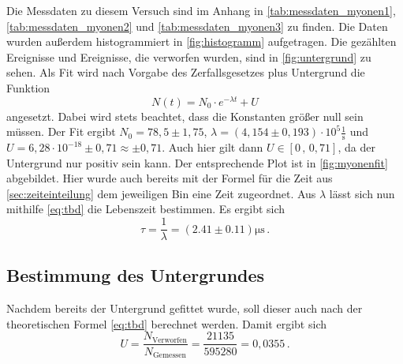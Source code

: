 Die Messdaten zu diesem Versuch sind im Anhang in \autoref{tab:messdaten_myonen1}, \autoref{tab:messdaten_myonen2} und \autoref{tab:messdaten_myonen3} zu finden.
Die Daten wurden außerdem histogrammiert in \autoref{fig:histogramm} aufgetragen.
Die gezählten Ereignisse und Ereignisse, die verworfen wurden, sind in \autoref{fig:untergrund} zu sehen.
Als Fit wird nach Vorgabe des Zerfallsgesetzes plus Untergrund die Funktion
\begin{equation*}
    N(t) = N_0 \cdot e^{- \lambda t} + U
\end{equation*} 
angesetzt.
Dabei wird stets beachtet, dass die Konstanten größer null sein müssen.
Der Fit ergibt $N_0 = 78,5 \pm 1,75$, $\lambda = (4,154 \pm 0,193) \cdot 10^5 \frac{1}{\unit{\second}}$ und $U = 6,28 \cdot 10^{-18} \pm 0,71 \approx \pm 0,71$.
Auch hier gilt dann $U \in [0 \, , \, 0,71]$, da der Untergrund nur positiv sein kann.
Der entsprechende Plot ist in \autoref{fig:myonenfit} abgebildet.
Hier wurde auch bereits mit der Formel für die Zeit aus \autoref{sec:zeiteinteilung} dem jeweiligen Bin eine Zeit zugeordnet.
Aus $\lambda$ lässt sich nun mithilfe \autoref{eq:tbd} die Lebenszeit bestimmen.
Es ergibt sich
\begin{equation}
    \tau = \frac{1}{\lambda} = (2.41 \pm 0.11) \unit{\micro\second} \, .
\end{equation}

\subsection{Bestimmung des Untergrundes} \label{sec:untergrund_ausw}

Nachdem bereits der Untergrund gefittet wurde, soll dieser auch nach der theoretischen Formel \autoref{eq:tbd} berechnet werden.
Damit ergibt sich
\begin{equation*}
    U = \frac{N_\text{Verworfen}}{N_\text{Gemessen}} = \frac{21135}{595280} = 0,0355 \, .
\end{equation*} 
